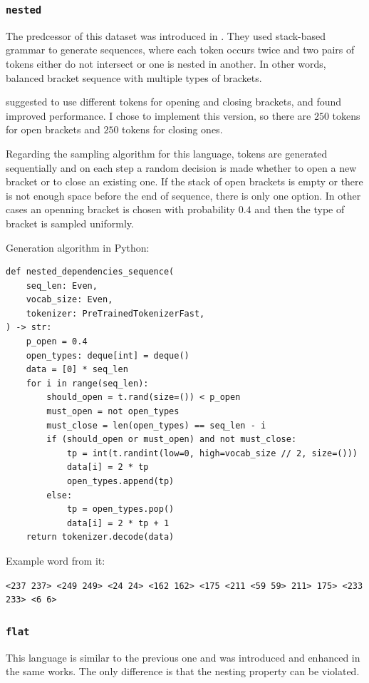 \documentclass[a4paper, 11pt, oneside]{article}
\begin{document}
	\subsubsection{\texttt{nested}}
	The predcessor of this dataset was introduced in
	\cite{papadimitriou2020learning}. They used stack-based grammar to generate sequences,
	where each token occurs twice and two pairs of tokens either do not intersect
	or one is nested in another. In other words, balanced bracket sequence with
	multiple types of brackets.

	\cite{ri2022pretraining} suggested to use different tokens for opening and
	closing brackets, and found improved performance. I chose to implement this
	version, so there are $250$ tokens for open brackets and $250$ tokens for closing
	ones.

	Regarding the sampling algorithm for this language, tokens are generated
	sequentially and on each step a random decision is made whether to open a new
	bracket or to close an existing one. If the stack of open brackets is empty or
	there is not enough space before the end of sequence, there is only one option.
	In other cases an openning bracket is chosen with probability $0.4$ and then the
	type of bracket is sampled uniformly.

	Generation algorithm in Python:
	\begin{verbatim}
def nested_dependencies_sequence(
    seq_len: Even,
    vocab_size: Even,
    tokenizer: PreTrainedTokenizerFast,
) -> str:
    p_open = 0.4
    open_types: deque[int] = deque()
    data = [0] * seq_len
    for i in range(seq_len):
        should_open = t.rand(size=()) < p_open
        must_open = not open_types
        must_close = len(open_types) == seq_len - i
        if (should_open or must_open) and not must_close:
            tp = int(t.randint(low=0, high=vocab_size // 2, size=()))
            data[i] = 2 * tp
            open_types.append(tp)
        else:
            tp = open_types.pop()
            data[i] = 2 * tp + 1
    return tokenizer.decode(data)
\end{verbatim}
	Example word from it:

	\verb|<237 237> <249 249> <24 24> <162 162> <175 <211 <59 59> 211> 175> <233 233> <6 6>|

	\subsubsection{\texttt{flat}}
	This language is similar to the previous one and was introduced and enhanced in
	the same works. The only difference is that the nesting property can be
	violated.
\end{document}
